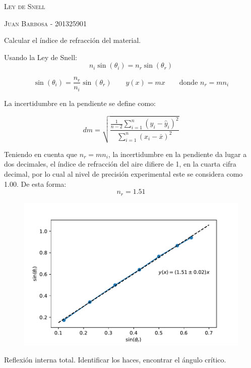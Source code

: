 \documentclass[addpoints,10pt]{exam}
\begin{document}
	\begin{center}
		\LARGE\scshape{Ley de Snell}
		
		\vspace{1cm}
		\large\scshape{Juan Barbosa - 201325901}
	\end{center}

	\begin{questions}
		{\question Calcular el \'indice de refracci\'on del material.}
				
		Usando la Ley de Snell:
		\begin{equation}
			n_i\sin(\theta_i) = n_r\sin(\theta_r)
		\end{equation}
		
		\begin{equation}
			\sin(\theta_i) = \dfrac{n_r}{n_i}\sin(\theta_r) \qquad y(x) = mx \qquad \text{donde $n_r = mn_i$}
		\end{equation}
		
		La incertidumbre en la pendiente se define como:
		
		\begin{equation}
			dm = \sqrt{\dfrac{\frac{1}{n-2}\sum\limits_{i = 1}^{n} \left(y_i - \hat{y}_i\right)^2} {\sum\limits_{i = 1}^{n}\left(x_i - \bar{x} \right)^2}}
		\end{equation}
		
		Teniendo en cuenta que $n_r = mn_i$, la incertidumbre en la pendiente da lugar a dos decimales, el \'indice de refracci\'on del aire difiere de 1, en la cuarta cifra decimal, por lo cual al nivel de precisi\'on experimental este se considera como 1.00. De esta forma:
		\begin{equation}
			n_r = 1.51
		\end{equation}
		\begin{figure}[h]
			\centering
			\includegraphics[width=0.6\linewidth]{indice.pdf}
		\end{figure}
		
		\newpage
		
		{\question Reflexi\'on interna total. Identificar los haces, encontrar el \'angulo cr\'itico.}
		

\end{questions}
\end{document}
